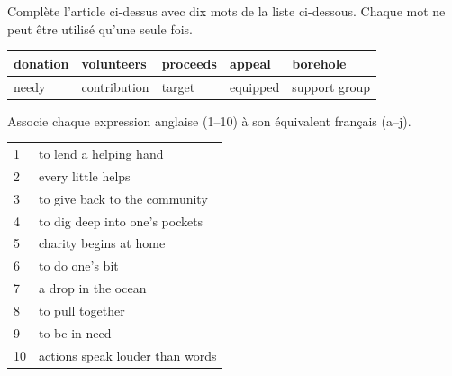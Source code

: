 \documentclass[11pt]{article}
\begin{document}
\begin{exercice}
Complète l'article ci-dessus avec dix mots de la liste ci-dessous. Chaque mot ne peut être utilisé qu'une seule fois.

\begin{center}
\begin{tabular}{|l|l|l|l|l|}
\hline
\rowcolor{popblueL} donation & volunteers & proceeds & appeal & borehole \\
\hline
\rowcolor{popblueL} needy & contribution & target & equipped & support group \\
\hline
\end{tabular}
\end{center}
\end{exercice}

\begin{exercice}
Associe chaque expression anglaise (1--10) à son équivalent français (a--j).

\begin{center}
\begin{tabularx}{\linewidth}{|l X|}
\hline
\rowcolor{popblueL} \multicolumn{2}{|l|}{\textbf{English expressions}} \\
\hline
1 & to lend a helping hand \\
2 & every little helps \\
3 & to give back to the community \\
4 & to dig deep into one's pockets \\
5 & charity begins at home \\
6 & to do one's bit \\
7 & a drop in the ocean \\
8 & to pull together \\
9 & to be in need \\
10 & actions speak louder than words \\
\hline
\end{tabularx}
\end{center}


\end{exercice}
\end{document}
